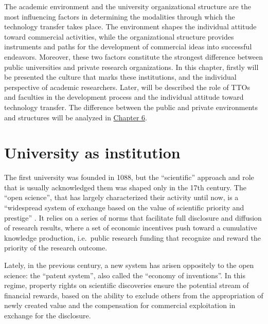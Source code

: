 

\label{Chapter2} %

The academic environment and the university organizational structure are the most influencing factors in determining the modalities through which the technology transfer takes place. The environment shapes the individual attitude toward commercial activities, while the organizational structure provides instruments and paths for the development of commercial ideas into successful endeavors. Moreover, these two factors constitute the strongest difference between public universities and private research organizations. In this chapter, firstly will be presented the culture that marks these institutions, and the individual perspective of academic researchers. Later, will be described the role of TTOs and faculties in the development process and the individual attitude toward technology transfer. The difference between the public and private environments and structures will be analyzed in \hyperref[Chapter6]{Chapter 6}.

\section{University as institution}

The first university was founded in 1088, but the \enquote{scientific} approach and role that is usually acknowledged them was shaped only in the 17th century. The \enquote{open science}, that has largely characterized their activity until now, is a \enquote{widespread system of exchange based on the value of scientific priority and prestige} \citep{Murray2005}. It relies on a series of norms that facilitate full disclosure and diffusion of research results, where a set of economic incentives push toward a cumulative knowledge production, i.e.\ public research funding that recognize and reward the priority of the research outcome.

Lately, in the previous century, a new system has arisen oppositely to the open science: the \enquote{patent system}, also called the \enquote{economy of inventions}. In this regime, property rights on scientific discoveries ensure the potential stream of financial rewards, based on the ability to exclude others from the appropriation of newly created value and the compensation for commercial exploitation in exchange for the disclosure. 

